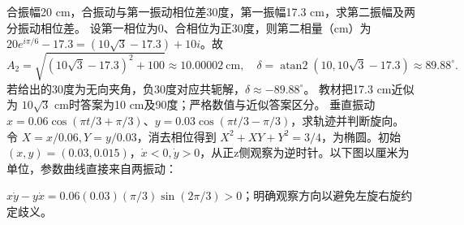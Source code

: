 \problemtext 合振幅20 cm，合振动与第一振动相位差30度，第一振幅17.3 cm，求第二振幅及两分振动相位差。
\workings 设第一相位为0、合相位为正30度，则第二相量（cm）为 $20e^{i\pi/6}-17.3=(10\sqrt3-17.3)+10i$。故
\[
A_2=\sqrt{(10\sqrt3-17.3)^2+100}\approx10.00002\ \mathrm{cm},\quad
\delta=\operatorname{atan2}(10,10\sqrt3-17.3)\approx89.88^\circ.
\]
若给出的30度为无向夹角，负30度对应共轭解，$\delta\approx-89.88^\circ$。
\crosscheck 教材把17.3 cm近似为 $10\sqrt3$ cm时答案为10 cm及90度；严格数值与近似答案区分。
\problemtext 垂直振动 $x=0.06\cos(\pi t/3+\pi/3)$、$y=0.03\cos(\pi t/3-\pi/3)$，求轨迹并判断旋向。
\workings 令 $X=x/0.06,Y=y/0.03$，消去相位得到 $X^2+XY+Y^2=3/4$，为椭圆。初始 $(x,y)=(0.03,0.015)$，$\dot x<0,\dot y>0$，从正z侧观察为逆时针。以下图以厘米为单位，参数曲线直接来自两振动：
\begin{center}
\end{center}
\crosscheck $x\dot y-y\dot x=0.06(0.03)(\pi/3)\sin(2\pi/3)>0$；明确观察方向以避免左旋右旋约定歧义。


